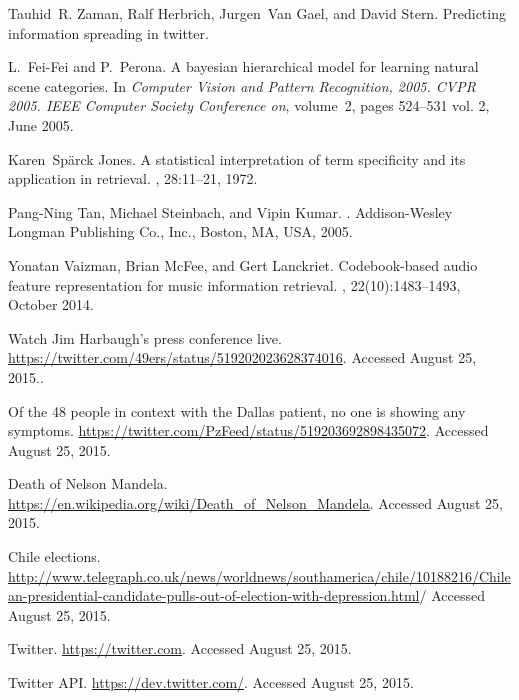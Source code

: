 \documentclass[10pt,letterpaper]{article}
\begin{document}
\begin{thebibliography}{10}
Tauhid~R. Zaman, Ralf Herbrich, Jurgen~Van Gael, and David Stern.
\newblock Predicting information spreading in twitter.

L.~Fei-Fei and P.~Perona.
\newblock A bayesian hierarchical model for learning natural scene categories.
\newblock In {\em Computer Vision and Pattern Recognition, 2005. CVPR 2005.
  IEEE Computer Society Conference on}, volume~2, pages 524--531 vol. 2, June
  2005.

Karen~Spärck Jones.
\newblock A statistical interpretation of term specificity and its application
  in retrieval.
, 28:11--21, 1972.

Pang-Ning Tan, Michael Steinbach, and Vipin Kumar.
.
\newblock Addison-Wesley Longman Publishing Co., Inc., Boston, MA, USA, 2005.


Yonatan Vaizman, Brian McFee, and Gert Lanckriet.
\newblock Codebook-based audio feature representation for music information
  retrieval.
,
  22(10):1483--1493, October 2014.

Watch Jim Harbaugh's press conference live.
\url{https://twitter.com/49ers/status/519202023628374016}.
\newblock Accessed August 25, 2015..

Of the 48 people in context with the Dallas patient, no one is showing any symptoms.
\url{https://twitter.com/PzFeed/status/519203692898435072}.
\newblock Accessed August 25, 2015.

Death of Nelson Mandela.
\url{https://en.wikipedia.org/wiki/Death_of_Nelson_Mandela}.
\newblock Accessed August 25, 2015.

Chile elections.
\url{http://www.telegraph.co.uk/news/worldnews/southamerica/chile/10188216/Chilean-presidential-candidate-pulls-out-of-election-with-depression.html}/
\newblock Accessed August 25, 2015.

Twitter.
\url{https://twitter.com}.
\newblock Accessed August 25, 2015.

Twitter API.
\url{https://dev.twitter.com/}.
\newblock Accessed August 25, 2015.

\end{thebibliography}
\end{document}
